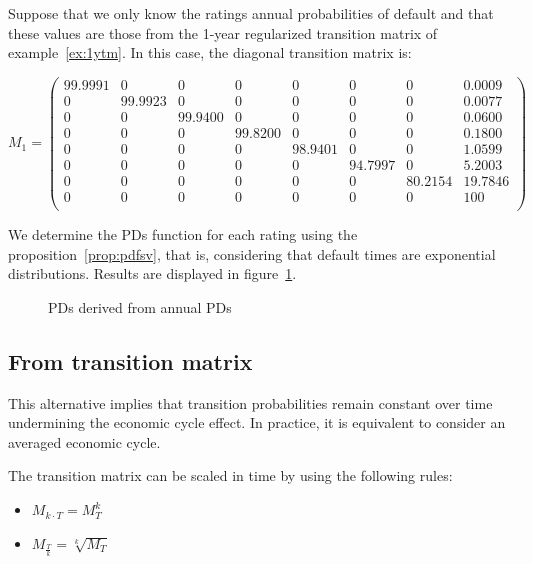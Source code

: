 \documentclass[11pt,fleqn]{book} %
\begin{document}
\begin{example}
	\label{ex:pdfsv}
	Suppose that we only know the ratings annual probabilities of default 
	and that these values are those from the 1-year regularized transition 
	matrix of example~\ref{ex:1ytm}. In this case, the diagonal transition 
	matrix is:
	{\small
	\begin{displaymath}
		M_1 = \left(
		\begin{array}{cccccccc}
			99.9991 & 0 & 0 & 0 & 0 & 0 & 0 & 0.0009 \\
			0 & 99.9923 & 0 & 0 & 0 & 0 & 0 & 0.0077 \\
			0 & 0 & 99.9400 & 0 & 0 & 0 & 0 & 0.0600 \\
			0 & 0 & 0 & 99.8200 & 0 & 0 & 0 & 0.1800 \\
			0 & 0 & 0 & 0 & 98.9401 & 0 & 0 & 1.0599 \\
			0 & 0 & 0 & 0 & 0 & 94.7997 & 0 & 5.2003 \\
			0 & 0 & 0 & 0 & 0 & 0 & 80.2154 & 19.7846 \\
			0 & 0 & 0 & 0 & 0 & 0 & 0 & 100 \\
		\end{array}
		\right)
	\end{displaymath}\par}
	We determine the PDs function for each rating using the 
	proposition~\ref{prop:pdfsv}, that is, considering that default times are 
	exponential distributions. Results are displayed in figure~\ref{fig:pdfsv}. 
	\begin{figure}[!ht]
		\centering
		\caption{PDs derived from annual PDs}
		\label{fig:pdfsv}
	\end{figure}
\end{example}

\subsection{From transition matrix}
\label{pdftm}

This alternative implies that transition probabilities remain constant
over time undermining the economic cycle effect. In practice, it is 
equivalent to consider an averaged economic cycle.

\begin{proposition}
	The transition matrix can be scaled in time by using the following rules:
	\begin{itemize}
		\item $M_{k \cdot T} = M_{T}^k$
		\item $M_{\frac{T}{k}} = \sqrt[k]{M_{T}}$
	\end{itemize}
\end{proposition}
\end{document}
